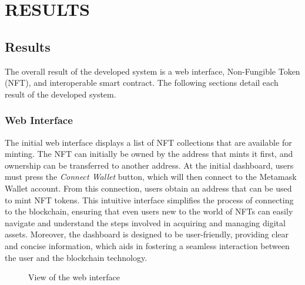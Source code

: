 \section{RESULTS}
\label{sec:results}
\subsection{Results}
The overall result of the developed system is a web interface, Non-Fungible Token (NFT), and interoperable smart contract. The following sections detail each result of the developed system.

\subsubsection{Web Interface}
The initial web interface displays a list of NFT collections that are available for minting. The NFT can initially be owned by the address that mints it first, and ownership can be transferred to another address. At the initial dashboard, users must press the \emph{Connect Wallet} button, which will then connect to the Metamask Wallet account. From this connection, users obtain an address that can be used to mint NFT tokens. This intuitive interface simplifies the process of connecting to the blockchain, ensuring that even users new to the world of NFTs can easily navigate and understand the steps involved in acquiring and managing digital assets. Moreover, the dashboard is designed to be user-friendly, providing clear and concise information, which aids in fostering a seamless interaction between the user and the blockchain technology.

\begin{figure}[H] \centering
  \caption{View of the web interface}
  \label{fig:web_view}
\end{figure}

